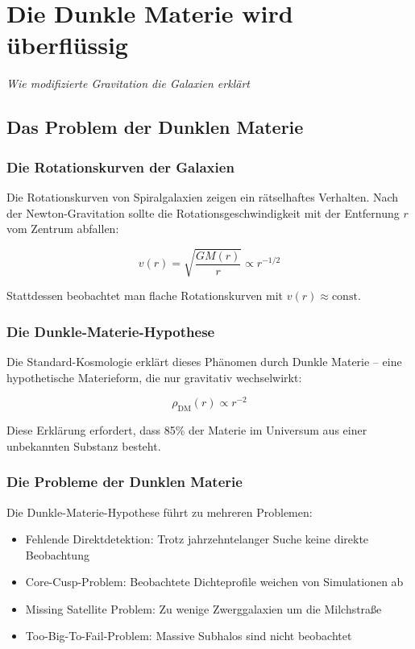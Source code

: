 \documentclass[12pt,a4paper]{report}
\begin{document}
	\chapter{Die Dunkle Materie wird überflüssig}
	\textit{Wie modifizierte Gravitation die Galaxien erklärt}
	
	\section{Das Problem der Dunklen Materie}
	
	\subsection{Die Rotationskurven der Galaxien}
	
	Die Rotationskurven von Spiralgalaxien zeigen ein rätselhaftes Verhalten. Nach der Newton-Gravitation sollte die Rotationsgeschwindigkeit mit der Entfernung $r$ vom Zentrum abfallen:
	
	\begin{equation}
		v(r) = \sqrt{\frac{GM(r)}{r}} \propto r^{-1/2}
	\end{equation}
	
	Stattdessen beobachtet man flache Rotationskurven mit $v(r) \approx \text{const}$.
	
	\subsection{Die Dunkle-Materie-Hypothese}
	
	Die Standard-Kosmologie erklärt dieses Phänomen durch Dunkle Materie -- eine hypothetische Materieform, die nur gravitativ wechselwirkt:
	
	\begin{equation}
		\rho_{\text{DM}}(r) \propto r^{-2}
	\end{equation}
	
	Diese Erklärung erfordert, dass 85\% der Materie im Universum aus einer unbekannten Substanz besteht.
	
	\subsection{Die Probleme der Dunklen Materie}
	
	Die Dunkle-Materie-Hypothese führt zu mehreren Problemen:
	
	\begin{itemize}
		\item Fehlende Direktdetektion: Trotz jahrzehntelanger Suche keine direkte Beobachtung
		\item Core-Cusp-Problem: Beobachtete Dichteprofile weichen von Simulationen ab
		\item Missing Satellite Problem: Zu wenige Zwerggalaxien um die Milchstraße
		\item Too-Big-To-Fail-Problem: Massive Subhalos sind nicht beobachtet
	\end{itemize}
	
\end{document}
